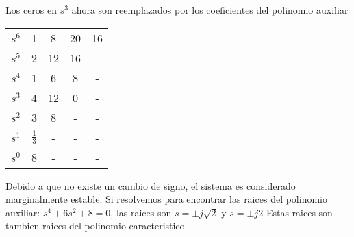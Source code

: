 \documentclass[
	12pt, %
]{fphw}
\begin{document}
\begin{enumerate}
  Los ceros en $s^3$ ahora son reemplazados por los coeficientes del polinomio auxiliar

    \begin{center}
\begin{tabular}{c c c c c}
$s^{6}$ & 1 & 8 & 20 & 16 \\
$s^{5}$ & 2 & 12 & 16 & - \\
$s^{4}$ & 1 & 6 & 8 & -\\
$s^{3}$ & 4 & 12 & 0 & - \\
  $s^{2}$ & 3 & 8 & - & -\\
  $s^{1}$ & $\frac{1}{3}$ & - & - & -\\
  $s^{0}$ & 8 & - & - & - 
\end{tabular}  
\end{center}

    Debido a que no existe un cambio de signo, el sistema es considerado marginalmente estable. Si resolvemos para encontrar las raices del polinomio auxiliar: $s^4+6s^2+8=0$, las raices son $s = \pm j \sqrt{2}$ y $s=\pm j2$ Estas raices son tambien raices del polinomio caracteristico
    
\end{enumerate}
\end{document}
